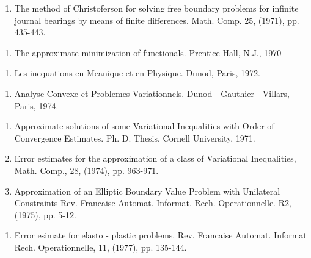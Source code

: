 \begin{thebibliography}{99}

  \begin{enumerate}
  \item The method of Christoferson for solving free boundary problems
 for infinite journal bearings by means of finite
 differences. Math. Comp. 25, (1971), pp. 435-443.\label{k40:e1} 
  \end{enumerate}


  \begin{enumerate}
  \item The approximate minimization of functionals. Prentice Hall,
 N.J., 1970\label{k41:e1} 
  \end{enumerate}


  \begin{enumerate}
  \item Les inequations en Meanique et en Physique. Dunod, Paris,
 1972.\label{k42:e1}
  \end{enumerate}


  \begin{enumerate}
  \item Analyse Convexe et Problemes Variationnels. Dunod - Gauthier -
 Villars, Paris, 1974.\label{k43:e1}
  \end{enumerate}


  \begin{enumerate}
  \item Approximate solutions of some Variational Inequalities with
 Order of Convergence Estimates. Ph. D. Thesis, Cornell University,
 1971.\label{k44:e1} 

  \item  Error estimates for the approximation of a class of
 Variational Inequalities, Math. Comp., 28, (1974),
 pp. 963-971.\label{k44:e2} 
 
  \item Approximation of an Elliptic Boundary Value Problem with
 Unilateral Constraints Rev. Francaise
 Automat. Informat. Rech. Operationnelle. R2, (1975),
 pp. 5-12.\label{k44:e3}   
  \end{enumerate}


  \begin{enumerate}
  \item Error esimate for elasto - plastic problems. Rev. Francaise
 Automat. Informat Rech. Operationnelle, 11, (1977),
 pp. 135-144.\label{k45:e1}  
  \end{enumerate}


\end{thebibliography}
